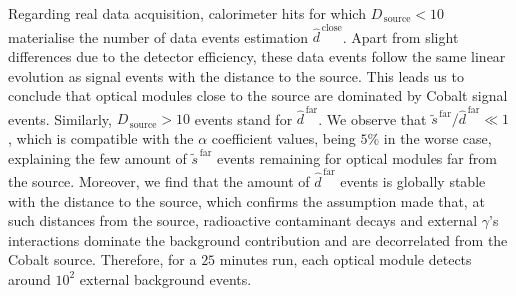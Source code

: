 Regarding real data acquisition, calorimeter hits for which $D_{\,\text{source}}<10$ materialise the number of data events estimation $\hat{d}^{\,\text{close}}$.
Apart from slight differences due to the detector efficiency, these data events follow the same linear evolution as signal events with the distance to the source.
This leads us to conclude that optical modules close to the source are dominated by Cobalt signal events.
Similarly, $D_{\,\text{source}}>10$ events stand for $\hat{d}^{\,\text{far}}$.
We observe that $\tilde{s}^{\,\text{far}}/\hat{d}^{\,\text{far}} \ll 1$, which is compatible with the $\alpha$ coefficient values, being $5\%$ in the worse case, explaining the few amount of $\tilde{s}^{\,\text{far}}$ events remaining for optical modules far from the source.
Moreover, we find that the amount of $\hat{d}^{\,\text{far}}$ events is globally stable with the distance to the source, which confirms the assumption made that, at such distances from the source, radioactive contaminant decays and external $\gamma$'s interactions dominate the background contribution and are decorrelated from the Cobalt source.
Therefore, for a $25$ minutes run, each optical module detects around $10^{2}$ external background events.

